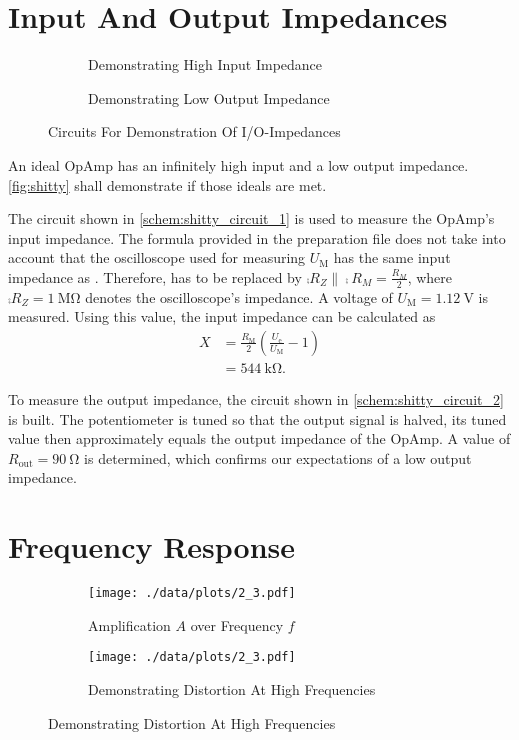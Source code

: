 \section{Input And Output Impedances}
\begin{figure}[tbp]
	\centering
	\begin{subfigure}{0.4\textwidth}
		\centering
		\caption{Demonstrating High Input Impedance}
		\label{schem:shitty_circuit_1}
	\end{subfigure}
	\begin{subfigure}{0.4\textwidth}
		\centering
		\caption{Demonstrating Low Output Impedance}
		\label{schem:shitty_circuit_2}
	\end{subfigure}
	\caption{Circuits For Demonstration Of I/O-Impedances}
	\label{fig:shitty}
\end{figure}
An ideal OpAmp has an infinitely high input and a low output impedance.
\autoref{fig:shitty} shall demonstrate if those ideals are met.

The circuit shown in \autoref{schem:shitty_circuit_1} is used to measure the OpAmp's input impedance.
The formula provided in the preparation file does not take into account that the oscilloscope used for measuring $U_\text{M}$ has the same input impedance as .
Therefore,  has to be replaced by $\comp{R_Z}\| \comp{R_M}=\tfrac{R_M}{2}$, where $\comp{R_Z}=\SI{1}{\mega\ohm}$ denotes the oscilloscope's impedance.
A voltage of $U_\text{M}=\SI{1.12}{\volt}$ is measured.
Using this value, the input impedance can be calculated as
\begin{align*}
	X&=\frac{R_\text{M}}{2}\left(\frac{U_\text{e}}{U_\text{M}}-1\right) \\
	&=\SI{544}{\kilo\ohm}.
\end{align*}

To measure the output impedance, the circuit shown in \autoref{schem:shitty_circuit_2} is built.
The potentiometer is tuned so that the output signal is halved, its tuned value then approximately equals the output impedance of the OpAmp.
A value of $R_\text{out}=\SI{90}{\ohm}$ is determined, which confirms our expectations of a low output impedance.

\section{Frequency Response}
\begin{figure}[tbp]
	\centering
	\begin{subfigure}{0.4\textwidth}
		\centering
		\texttt{[image: ./data/plots/2\_3.pdf]}
		\caption{Amplification $A$ over Frequency $f$}
		\label{fig:noninvert_amp}
	\end{subfigure}
	\qquad\qquad
	\begin{subfigure}{0.4\textwidth}
		\centering
		\texttt{[image: ./data/plots/2\_3.pdf]}
		\caption{Demonstrating Distortion At High Frequencies}
		\label{fig:noninvert_distortion}
	\end{subfigure}
\end{figure}

